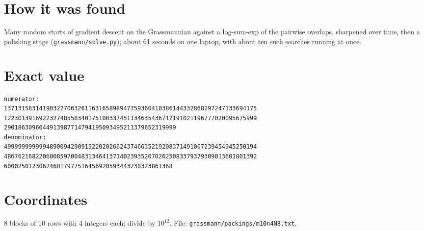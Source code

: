 \documentclass[11pt,a4paper]{article}
\begin{document}
\section{How it was found}
Many random starts of gradient descent on the Grassmannian against a log-sum-exp of the pairwise overlaps, sharpened over time, then a polishing stage (\texttt{grassmann/solve.py}); about 61 seconds on one laptop, with about ten such searches running at once.


\appendix
\section{Exact value}
{\small
\begin{verbatim}
numerator:
137131583141903227063261163165898947759360410386144332868297247133694175
122301391692232748558340175100337451134635436712191021196777020095675999
2901863096044913987714794195093495211379652319999
denominator:
499999999999489009429091522020266243746635219208371491007239454945250194
486762168220600859700483134641371402393520702625083379379309013601801392
600025012306246017977516456920593443238323861368
\end{verbatim}}

\section{Coordinates}
8 blocks of 10 rows with 4 integers each; divide by $10^{12}$. File: \texttt{grassmann/packings/m10n4N8.txt}.
{\tiny
\begin{multicols}{3}
\end{multicols}}
\end{document}
